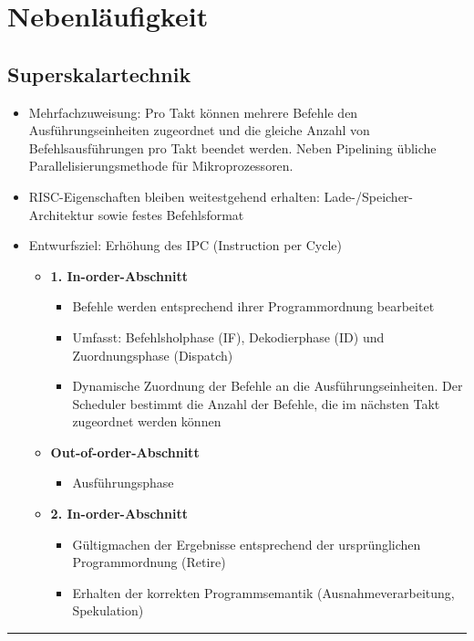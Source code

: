 \section{Nebenläufigkeit}
	\subsection{Superskalartechnik}
		\begin{itemize}
			\item Mehrfachzuweisung: Pro Takt können mehrere Befehle den Ausführungseinheiten zugeordnet und die gleiche Anzahl von Befehlsausführungen pro Takt beendet werden. Neben Pipelining übliche Parallelisierungsmethode für Mikroprozessoren.
			\item RISC-Eigenschaften bleiben weitestgehend erhalten: Lade-/Speicher-Architektur sowie festes Befehlsformat
			\item Entwurfsziel: Erhöhung des IPC (Instruction per Cycle)
			\begin{itemize}
				\item \textbf{1. In-order-Abschnitt}
				\begin{itemize}
					\item Befehle werden entsprechend ihrer Programmordnung bearbeitet
					\item Umfasst: Befehlsholphase (IF), Dekodierphase (ID) und Zuordnungsphase (Dispatch)
					\item Dynamische Zuordnung der Befehle an die Ausführungseinheiten. Der Scheduler bestimmt die Anzahl der Befehle, die im nächsten Takt zugeordnet werden können
				\end{itemize}
				\item \textbf{Out-of-order-Abschnitt}
				\begin{itemize}
					\item Ausführungsphase
				\end{itemize}
				\item \textbf{2. In-order-Abschnitt}
				\begin{itemize}
					\item Gültigmachen der Ergebnisse entsprechend der ursprünglichen Programmordnung (Retire)
					\item Erhalten der korrekten Programmsemantik (Ausnahmeverarbeitung, Spekulation)
				\end{itemize}
			\end{itemize}
		\end{itemize}

		\par\noindent\rule{\textwidth}{0.4pt}
